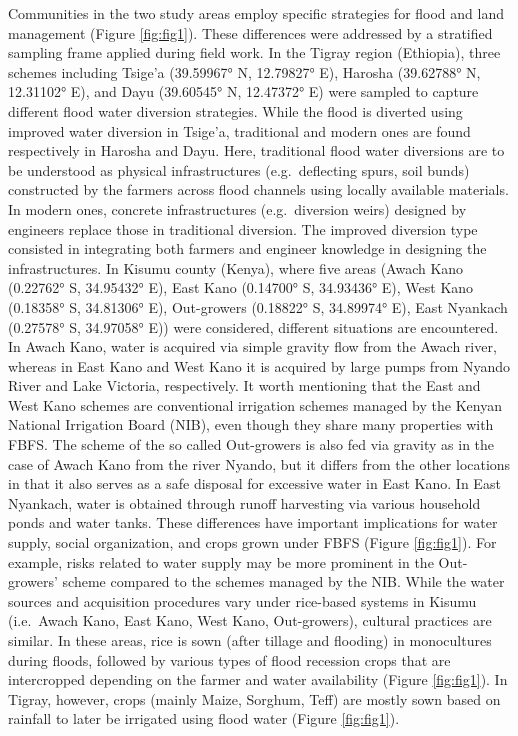 \documentclass[12pt,oneside]{article}
\begin{document}
Communities in the two study areas employ specific strategies for flood and land management (Figure \ref{fig:fig1}). These differences were addressed by a stratified sampling frame applied during field work. In the Tigray region (Ethiopia), three schemes including Tsige'a (39.59967° N, 12.79827° E), Harosha (39.62788° N, 12.31102° E), and Dayu (39.60545° N, 12.47372° E) were sampled to capture different flood water diversion strategies. While the flood is diverted using improved water diversion in Tsige'a, traditional and modern ones are found respectively in Harosha and Dayu. Here, traditional flood water diversions are to be understood as physical infrastructures (e.g.~deflecting spurs, soil bunds) constructed by the farmers across flood channels using locally available materials. In modern ones, concrete infrastructures (e.g.~diversion weirs) designed by engineers replace those in traditional diversion. The improved diversion type consisted in integrating both farmers and engineer knowledge in designing the infrastructures. In Kisumu county (Kenya), where five areas (Awach Kano (0.22762° S, 34.95432° E), East Kano (0.14700° S, 34.93436° E), West Kano (0.18358° S, 34.81306° E), Out-growers (0.18822° S, 34.89974° E), East Nyankach (0.27578° S, 34.97058° E)) were considered, different situations are encountered. In Awach Kano, water is acquired via simple gravity flow from the Awach river, whereas in East Kano and West Kano it is acquired by large pumps from Nyando River and Lake Victoria, respectively. It worth mentioning that the East and West Kano schemes are conventional irrigation schemes managed by the Kenyan National Irrigation Board (NIB), even though they share many properties with FBFS. The scheme of the so called Out-growers is also fed via gravity as in the case of Awach Kano from the river Nyando, but it differs from the other locations in that it also serves as a safe disposal for excessive water in East Kano. In East Nyankach, water is obtained through runoff harvesting via various household ponds and water tanks. These differences have important implications for water supply, social organization, and crops grown under FBFS (Figure \ref{fig:fig1}). For example, risks related to water supply may be more prominent in the Out-growers' scheme compared to the schemes managed by the NIB. While the water sources and acquisition procedures vary under rice-based systems in Kisumu (i.e.~Awach Kano, East Kano, West Kano, Out-growers), cultural practices are similar. In these areas, rice is sown (after tillage and flooding) in monocultures during floods, followed by various types of flood recession crops that are intercropped depending on the farmer and water availability (Figure \ref{fig:fig1}). In Tigray, however, crops (mainly Maize, Sorghum, Teff) are mostly sown based on rainfall to later be irrigated using flood water (Figure \ref{fig:fig1}).
\end{document}

